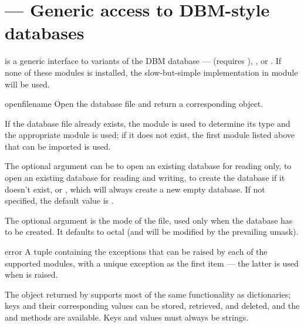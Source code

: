 \section{ ---
         Generic access to DBM-style databases}



 is a generic interface to variants of the DBM
database ---  (requires
),
, or
.  If none of these modules is
installed, the slow-but-simple implementation in module
 will be used.

\begin{funcdesc}{open}{filename}
Open the database file  and return a corresponding object.

If the database file already exists, the  module is 
used to determine its type and the appropriate module is used; if it
does not exist, the first module listed above that can be imported is
used.

The optional  argument can be
 to open an existing database for reading only,
 to open an existing database for reading and writing,
 to create the database if it doesn't exist, or
, which will always create a new empty database.  If not
specified, the default value is .

The optional  argument is the \UNIX{} mode of the file, used
only when the database has to be created.  It defaults to octal
 (and will be modified by the prevailing umask).
\end{funcdesc}

\begin{excdesc}{error}
A tuple containing the exceptions that can be raised by each of the
supported modules, with a unique exception  as
the first item --- the latter is used when  is
raised.
\end{excdesc}

The object returned by  supports most of the same
functionality as dictionaries; keys and their corresponding values can
be stored, retrieved, and deleted, and the  and
 methods are available.  Keys and values must always be
strings.


